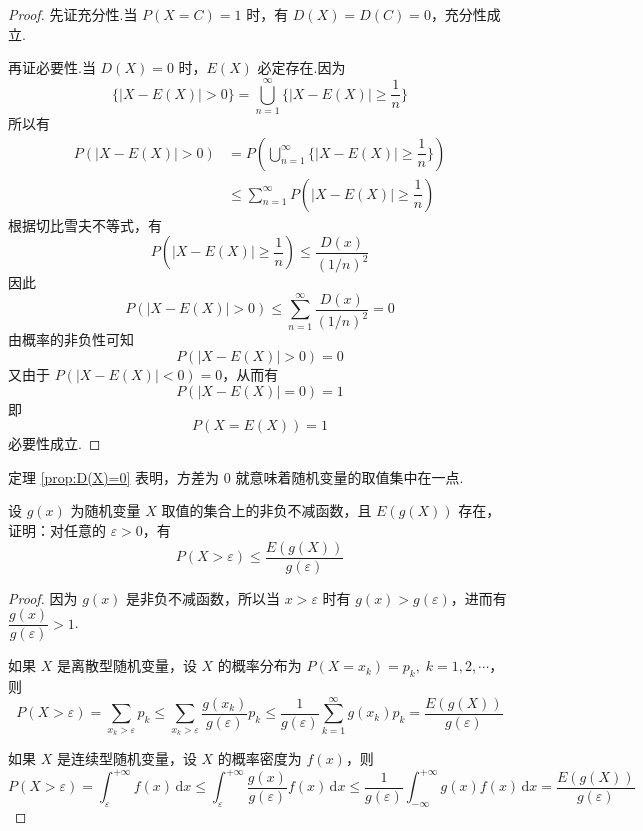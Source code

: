 \begin{proof}
    先证充分性.当 $P(X=C)=1$ 时，有 $D(X)=D(C)=0$，充分性成立.

    再证必要性.当 $D(X)=0$ 时，$E(X)$ 必定存在.因为
    $$
    \{ |X-E(X)|>0 \} = \bigcup_{n=1}^{\infty} \{ |X-E(X)| \geqslant \dfrac{1}{n} \}
    $$
    所以有
    $$
    \begin{aligned}
        P(|X-E(X)|>0) &= P \left( \bigcup_{n=1}^{\infty} \{ |X-E(X)| \geqslant \dfrac{1}{n} \} \right) \\
        & \leqslant \sum_{n=1}^{\infty} P(|X-E(X)| \geqslant \dfrac{1}{n})
    \end{aligned}
    $$
    根据切比雪夫不等式，有
    $$
    P(|X-E(X)| \geqslant \dfrac{1}{n}) \leqslant \dfrac{D(x)}{(1/n)^2}
    $$
    因此
    $$
    P(|X-E(X)|>0) \leqslant \sum_{n=1}^{\infty} \dfrac{D(x)}{(1/n)^2} = 0
    $$
    由概率的非负性可知
    $$
    P(|X-E(X)|>0) = 0
    $$
    又由于 $P(|X-E(X)|<0) = 0$，从而有
    $$
    P(|X-E(X)|=0) = 1
    $$
    即
    $$
    P(X=E(X)) = 1
    $$
    必要性成立.
\end{proof}

定理 \ref{prop:D(X)=0} 表明，方差为 $0$ 就意味着随机变量的取值集中在一点.

\begin{example}
    \indent 设 $g(x)$ 为随机变量 $X$ 取值的集合上的非负不减函数，且 $E(g(X))$ 存在，证明：对任意的 $\varepsilon > 0$，有
    $$
    P(X > \varepsilon) \leqslant \dfrac{E(g(X))}{g(\varepsilon)}
    $$
\end{example}

\begin{proof}
    因为 $g(x)$ 是非负不减函数，所以当 $x > \varepsilon$ 时有 $g(x) > g(\varepsilon)$，进而有 $\dfrac{g(x)}{g(\varepsilon)} > 1$.

    如果 $X$ 是离散型随机变量，设 $X$ 的概率分布为 $P(X = x_k) = p_k, \; k=1,2,\cdots$，则
    $$
    P(X > \varepsilon) = \sum_{x_k > \varepsilon} p_k \leqslant \sum_{x_k > \varepsilon} \dfrac{g(x_k)}{g(\varepsilon)} p_k \leqslant \dfrac{1}{g(\varepsilon)} \sum_{k=1}^{\infty} g(x_k) p_k = \dfrac{E(g(X))}{g(\varepsilon)}
    $$

    如果 $X$ 是连续型随机变量，设 $X$ 的概率密度为 $f(x)$，则
    $$
    P(X > \varepsilon) = \int_{\varepsilon}^{+\infty} f(x)\,\text{d}x \leqslant \int_{\varepsilon}^{+\infty} \dfrac{g(x)}{g(\varepsilon)} f(x)\,\text{d}x \leqslant \dfrac{1}{g(\varepsilon)} \int_{-\infty}^{+\infty} g(x) f(x)\,\text{d}x = \dfrac{E(g(X))}{g(\varepsilon)}
    $$
\end{proof}

